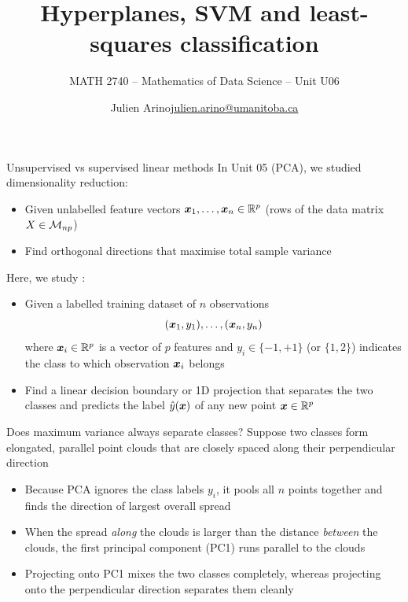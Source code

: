 \documentclass[aspectratio=169]{beamer}\usepackage[]{graphicx}\usepackage[]{xcolor}
\subtitle{MATH 2740 -- Mathematics of Data Science -- Unit U06}
\author{\texorpdfstring{Julien Arino\newline\url{julien.arino@umanitoba.ca}}{Julien Arino}}
\institute{Department of Mathematics @ University of Manitoba}
\title{Hyperplanes, SVM and least-squares classification}
\begin{document}
\setcounter{theorem}{87}

\SStitlepage
\SSoutlinepage



\begin{frame}{Unsupervised vs supervised linear methods}
    In Unit 05 (PCA), we studied  dimensionality reduction:
    \begin{itemize}
        \item Given unlabelled feature vectors $\bm{x}_1, \ldots, \bm{x}_n \in \mathbb{R}^p$ (rows of the data matrix $X \in \mathcal{M}_{np}$)
        \item Find orthogonal directions that maximise total sample variance
    \end{itemize}
    \vfill
    Here, we study :
    \begin{itemize}
        \item Given a labelled training dataset of $n$ observations
        \[
            (\bm{x}_1, y_1), \ldots, (\bm{x}_n, y_n)
        \]
        where $\bm{x}_i \in \mathbb{R}^p$ is a vector of $p$ features and $y_i \in \{-1, +1\}$ (or $\{1, 2\}$) indicates the class to which observation $\bm{x}_i$ belongs
        \item Find a linear decision boundary or 1D projection that separates the two classes and predicts the label $\hat{y}(\bm{x})$ of any new point $\bm{x} \in \mathbb{R}^p$
    \end{itemize}
\end{frame}


\begin{frame}{Does maximum variance always separate classes?}
    Suppose two classes form elongated, parallel point clouds that are closely spaced along their perpendicular direction
    \vfill
    \begin{itemize}
        \item Because PCA ignores the class labels $y_i$, it pools all $n$ points together and finds the direction of largest overall spread
        \vfill
        \item When the spread \emph{along} the clouds is larger than the distance \emph{between} the clouds, the first principal component (PC1) runs parallel to the clouds
        \vfill
        \item Projecting onto PC1 mixes the two classes completely, whereas projecting onto the perpendicular direction separates them cleanly
    \end{itemize}
\end{frame}
\end{document}
